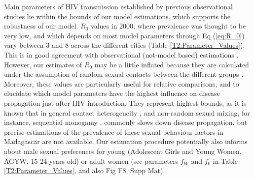 \documentclass[preprint,12pt]{elsarticle}
\begin{document}
Main parameters of HIV transmission established by previous observational studies lie within the bounds of our model estimations, which supports the robustness of our model. $R_0$ values in 2000, where prevalence was thought to be very low, and which depends on most model parameters through Eq (\ref{eq:R_0}) vary between 3 and 8 across the different cities (Table \ref{T2:Parameter_Values}). This is in good agreement with  observational (not-model based) estimations \cite{Nsubuga2014}. However, our estimates of $R_0$ may be a little inflated because they are calculated under the assumption of random sexual contacts between the different groups \cite{Diekmann2010}. Moreover, these values are particularly useful for relative comparisons, and to elucidate which model parameters have the highest influence on disease propagation just after HIV introduction. They represent highest bounds, as it is known that in general contact heterogeneity \cite{Britton2020}, and non-random sexual mixing, for instance, sequential monogamy \cite{Hollingsworth2008}, commonly slows down disease propagation, but precise estimations of the prevalence of these sexual behaviour factors in Madagascar are not available. Our estimation procedure potentially also informs about male sexual preferences for young (Adolescent Girls and Young Women, AGYW, 15-24 years old) or adult women (see parameters $f_W$ and $f_0$ in Table \ref{T2:Parameter_Values}, and also Fig F8, Supp Mat). 
\smallskip
\end{document}
